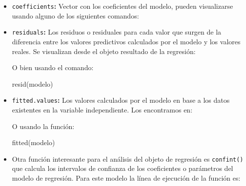 \documentclass[
  spanish,
  a4paper,
]{scrbook}
\newenvironment{Shaded}{\begin{snugshade}}{\end{snugshade}}
\newcommand{\FunctionTok}[1]{\textcolor[rgb]{0.28,0.35,0.67}{#1}}
\newcommand{\NormalTok}[1]{\textcolor[rgb]{0.00,0.23,0.31}{#1}}
\newcommand{\SpecialCharTok}[1]{\textcolor[rgb]{0.37,0.37,0.37}{#1}}
\begin{document}
\begin{itemize}
\item
  \texttt{coefficients}\textbf{:} Vector con los coeficientes del
  modelo, pueden visualizarse usando alguno de los siguientes comandos:

\begin{Shaded}
\end{Shaded}
\item
  \texttt{residuals}\textbf{:} Los residuos o residuales para cada valor
  que surgen de la diferencia entre los valores predictivos calculados
  por el modelo y los valores reales. Se visualizan desde el objeto
  resultado de la regresión:

\begin{Shaded}
\end{Shaded}

  O bien usando el comando:

\begin{Shaded}
\begin{Highlighting}[]
\FunctionTok{resid}\NormalTok{(modelo)}
\end{Highlighting}
\end{Shaded}
\item
  \texttt{fitted.values}\textbf{:} Los valores calculados por el modelo
  en base a los datos existentes en la variable independiente. Los
  encontramos en:

\begin{Shaded}
\end{Shaded}

  O usando la función:

\begin{Shaded}
\begin{Highlighting}[]
\FunctionTok{fitted}\NormalTok{(modelo)}
\end{Highlighting}
\end{Shaded}
\item
  Otra función interesante para el análisis del objeto de regresión es
  \texttt{confint()} que calcula los intervalos de confianza de los
  coeficientes o parámetros del modelo de regresión. Para este modelo la
  línea de ejecución de la función es:


\end{itemize}
\end{document}
